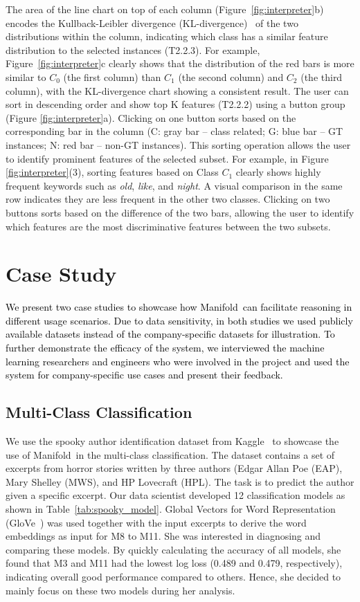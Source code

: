 \documentclass[preprint,journal]{vgtc}       %
\newcommand{\revcolor}{black}
\newcommand{\techname}{Manifold}
\begin{document}
The area of the line chart on top of each column (Figure~\ref{fig:interpreter}b) encodes the Kullback-Leibler divergence (KL-divergence)~\cite{kullback1951information} of the two distributions within the column, indicating which class has a similar feature distribution to the selected instances (T2.2.3). For example, Figure~\ref{fig:interpreter}c clearly shows that the distribution of the red bars is more similar to $C_0$ (the first column) than $C_1$ (the second column) and $C_2$ (the third column), with the KL-divergence chart showing a consistent result. The user can sort in descending order and show top K features (T2.2.2) using a button group (Figure \ref{fig:interpreter}a). Clicking on one button sorts based on the corresponding bar in the column (C: gray bar -- class related; G: blue bar -- GT instances; N: red bar -- non-GT instances). This sorting operation allows the user to identify prominent features of the selected subset. For example, in Figure \ref{fig:interpreter}(3), sorting features based on Class $C_1$ clearly shows highly frequent keywords such as \textit{old}, \textit{like}, and \textit{night}. A visual comparison in the same row indicates they are less frequent in the other two classes. Clicking on two buttons sorts based on the difference of the two bars, allowing the user to identify which features are the most discriminative features between the two subsets.

\section{Case Study}
\textcolor{\revcolor}{We present two case studies to showcase how \techname\ can facilitate reasoning in different usage scenarios. Due to data sensitivity, in both studies we used publicly available datasets instead of the company-specific datasets for illustration. To further demonstrate the efficacy of the system, we interviewed the machine learning researchers and engineers who were involved in the project and used the system for company-specific use cases and present their feedback.}

\subsection{Multi-Class Classification}
We use the spooky author identification dataset from Kaggle~\cite{spookyauthor} to showcase the use of \techname\ in the multi-class classification. The dataset contains a set of excerpts from horror stories written by three authors (Edgar Allan Poe (EAP), Mary Shelley (MWS), and HP Lovecraft (HPL). The task is to predict the author given a specific excerpt. Our data scientist developed 12 classification models as shown in Table~\ref{tab:spooky_model}. Global Vectors for Word Representation (GloVe~\cite{pennington2014glove}) was used together with the input excerpts to derive the word embeddings as input for M8 to M11. She was interested in diagnosing and comparing these models. By quickly calculating the accuracy of all models, she found that M3 and M11 had the lowest log loss (0.489 and 0.479, respectively), indicating overall good  performance compared to others. Hence, she decided to mainly focus on these two models during her analysis.
\end{document}
